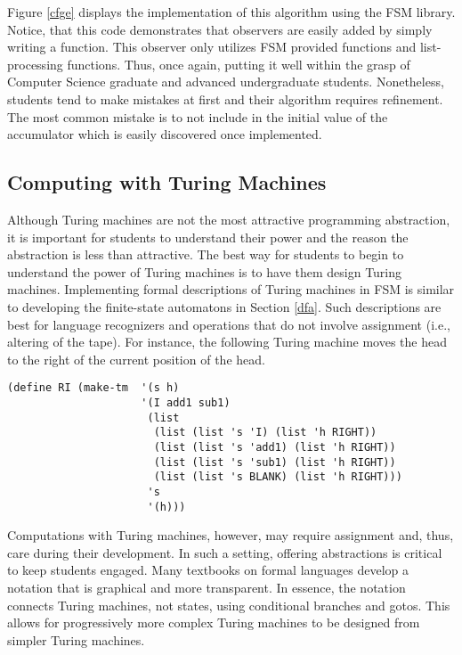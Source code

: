 \documentclass{eptcs}
\begin{document}
Figure \ref{cfge} displays the implementation of this algorithm using the \textsf{FSM} library. Notice, that this code demonstrates that observers are easily added by simply writing a function. This observer only utilizes \textsf{FSM} provided functions and list-processing functions. Thus, once again, putting it well within the grasp of Computer Science graduate and advanced undergraduate students. Nonetheless, students tend to make mistakes at first and their algorithm requires refinement. The most common mistake is to not include  in the initial value of the accumulator which is easily discovered once implemented.

\subsection{Computing with Turing Machines}
Although Turing machines are not the most attractive programming abstraction, it is important for students to understand their power and the reason the abstraction is less than attractive. The best way for students to begin to understand the power of Turing machines is to have them design Turing machines. Implementing formal descriptions of Turing machines in \textsf{FSM} is similar to developing the finite-state automatons in Section \ref{dfa}. Such descriptions are best for language recognizers and operations that do not involve assignment (i.e., altering of the tape). For instance, the following Turing machine moves the head to the right of the current position of the head.

\begin{verbatim}
(define RI (make-tm  '(s h)
                     '(I add1 sub1)
                      (list
                       (list (list 's 'I) (list 'h RIGHT))
                       (list (list 's 'add1) (list 'h RIGHT))
                       (list (list 's 'sub1) (list 'h RIGHT))
                       (list (list 's BLANK) (list 'h RIGHT)))
                      's
                      '(h)))
\end{verbatim}

Computations with Turing machines, however, may require assignment and, thus, care during their development. In such a setting, offering abstractions is critical  to keep students engaged. Many textbooks on formal languages develop a notation that is graphical and more transparent. In essence, the notation connects Turing machines, not states, using conditional branches and gotos. This allows for progressively more complex Turing machines to be designed from simpler Turing machines.
\end{document}
